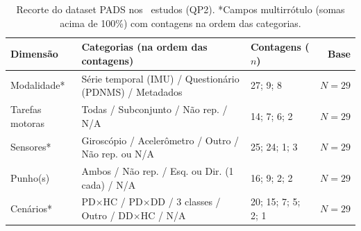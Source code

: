 \begin{table}[htbp]
\centering
\caption{Recorte do dataset PADS nos \nTotal\ estudos (QP2). *Campos multirrótulo (somas acima de 100\%) com contagens na ordem das categorias.}
\label{tab:recorte}
{\scriptsize
\setlength{\tabcolsep}{3.5pt}
\begin{tabular}{@{}l l l r@{}}
\toprule
\textbf{Dimensão} & \textbf{Categorias (na ordem das contagens)} & \textbf{Contagens ($n$)} & \textbf{Base} \\
\midrule
Modalidade* & Série temporal (IMU) / Questionário (PDNMS) / Metadados & 27; 9; 8 & $N=29$ \\
Tarefas motoras & Todas / Subconjunto / Não rep. / N/A & 14; 7; 6; 2 & $N=29$ \\
Sensores* & Giroscópio / Acelerômetro / Outro / Não rep. ou N/A & 25; 24; 1; 3 & $N=29$ \\
Punho(s) & Ambos / Não rep. / Esq. ou Dir. (1 cada) / N/A & 16; 9; 2; 2 & $N=29$ \\
Cenários* & PD$\times$HC / PD$\times$DD / 3 classes / Outro / DD$\times$HC / N/A & 20; 15; 7; 5; 2; 1 & $N=29$ \\
\bottomrule
\end{tabular}
}
\end{table}

